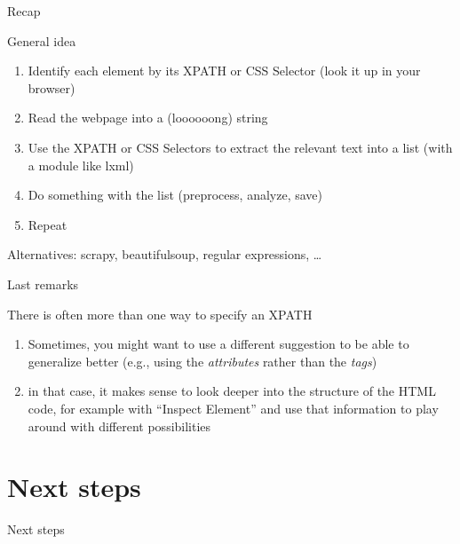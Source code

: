 \documentclass{beamer}
\begin{document}
\begin{frame}{Recap}
\begin{block}{General idea}
\begin{enumerate}
\item Identify each element by its XPATH or CSS Selector (look it up in your browser) 
\item Read the webpage into a (loooooong) string
\item Use the XPATH  or CSS Selectors to extract the relevant text into a list (with a module like lxml)
\item Do something with the list (preprocess, analyze, save)
\item Repeat
\end{enumerate}
\footnotesize{Alternatives: scrapy, beautifulsoup, regular expressions, \ldots}
\end{block}
\end{frame}


\begin{frame}{Last remarks}
	\begin{block}{There is often more than one way to specify an XPATH}
		\begin{enumerate}
			\item Sometimes, you might want to use a different suggestion to be able to generalize better (e.g., using the \emph{attributes} rather than the \emph{tags})
			\item in that case, it makes sense to look deeper into the structure of the HTML code, for example with ``Inspect Element'' and use that information to play around with different possibilities
		\end{enumerate}
	\end{block}
\end{frame}


{
	\begin{frame}[plain]
	\end{frame}
}

\section{Next steps}
\begin{frame}
Next steps
\end{frame}
\end{document}

